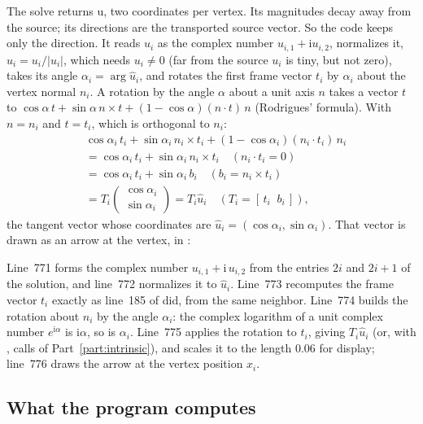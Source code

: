 The solve returns $\mathrm u$, two coordinates per vertex. Its magnitudes decay away from the source; its directions are the transported source vector. So the code keeps only the direction. It reads $u_i$ as the complex number $u_{i,1} + \mathrm i u_{i,2}$, normalizes it, $\hat u_i = u_i / |u_i|$, which needs $u_i \neq 0$ (far from the source $u_i$ is tiny, but not zero), takes its angle $\alpha_i = \arg \hat u_i$, and rotates the first frame vector $t_i$ by $\alpha_i$ about the vertex normal $n_i$. A rotation by the angle $\alpha$ about a unit axis $n$ takes a vector $t$ to $\cos\alpha\, t + \sin\alpha\, n\times t + (1 - \cos\alpha)(n\cdot t)\, n$ (Rodrigues' formula). With $n = n_i$ and $t = t_i$, which is orthogonal to $n_i$:
\begin{align*}
&\cos \alpha_i\, t_i + \sin \alpha_i\, n_i\times t_i + (1 - \cos\alpha_i)(n_i\cdot t_i)\, n_i \\
&= \cos \alpha_i\, t_i + \sin \alpha_i\, n_i\times t_i \quad (n_i\cdot t_i = 0)\\
&= \cos\alpha_i\, t_i + \sin\alpha_i\, b_i \quad (b_i = n_i\times t_i)\\
&= T_i \begin{pmatrix}\cos\alpha_i \\ \sin\alpha_i\end{pmatrix} = T_i\hat u_i \quad (T_i = [\,t_i\;\;b_i\,]) ,
\end{align*}
the tangent vector whose coordinates are $\hat u_i = (\cos\alpha_i, \sin\alpha_i)$. That vector is drawn as an arrow at the vertex, in :

Line~771 forms the complex number $u_{i,1} + \mathrm i\, u_{i,2}$ from the entries $2i$ and $2i+1$ of the solution, and line~772 normalizes it to $\hat u_i$. Line~773 recomputes the frame vector $t_i$ exactly as line~185 of  did, from the same neighbor. Line~774 builds the rotation about $n_i$ by the angle $\alpha_i$: the complex logarithm of a unit complex number $e^{\mathrm i\alpha}$ is $\mathrm i\alpha$, so  is $\alpha_i$. Line~775 applies the rotation to $t_i$, giving $T_i\hat u_i$ (or, with , calls  of Part~\ref{part:intrinsic}), and scales it to the length $0.06$ for display; line~776 draws the arrow at the vertex position $x_i$.

\subsection{What the program computes}

